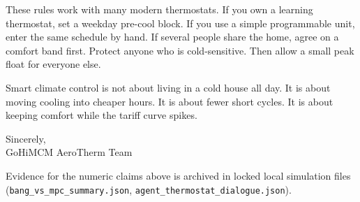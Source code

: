\documentclass[11pt]{article}
\begin{document}
\medskip
\noindent
These rules work with many modern thermostats.
If you own a learning thermostat, set a weekday pre-cool block.
If you use a simple programmable unit, enter the same schedule by hand.
If several people share the home, agree on a comfort band first.
Protect anyone who is cold-sensitive.
Then allow a small peak float for everyone else.

\medskip
\noindent
Smart climate control is not about living in a cold house all day.
It is about moving cooling into cheaper hours.
It is about fewer short cycles.
It is about keeping comfort while the tariff curve spikes.

\medskip
\noindent
Sincerely,\\
GoHiMCM AeroTherm Team

\vspace{1.0em}
{\small
Evidence for the numeric claims above is archived in locked local simulation
files (\texttt{bang\_vs\_mpc\_summary.json},
\texttt{agent\_thermostat\_dialogue.json}).
}
\end{document}
